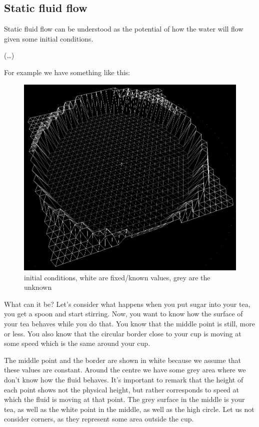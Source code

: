 \documentclass[a4paper,12pt]{article}
\begin{document}
\newpage

\subsection{Static fluid flow}

Static fluid flow can be understood as the potential of how the water will flow given some initial conditions.

(\ldots)


For example we have something like this:

\begin{figure}[H]
\begin{center}
  \includegraphics[width=\textwidth]{flow_initial}
\end{center}
\caption{initial conditions, white are fixed/known values, grey are the unknown}
\end{figure}

What can it be? Let's consider what happens when you put sugar into your tea, you get a spoon and start stirring. Now,
you want to know how the surface of your tea behaves while you do that. You know that the middle point is still, more or
less. You also know that the circular border close to your cup is moving at some speed which is the same around your cup.

The middle point and the border are shown in white because we assume that these values are constant. Around the centre
we have some grey area where we don't know how the fluid behaves. It's important to remark that the height of each point
shows not the physical height, but rather corresponds to speed at which the fluid is moving at that point. The grey
surface in the middle is your tea, as well as the white point in the middle, as well as the high circle. Let us not
consider corners, as they represent some area outside the cup.
\end{document}
